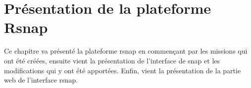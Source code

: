 \chapter{Présentation de la plateforme Rsnap}
Ce chapitre va présenté la plateforme \gls{rsnap} en commençant par les missions qui ont été créées, ensuite vient la présentation de l'interface de \gls{snap} et les modifications qui y ont été apportées. Enfin, vient la présentation de la partie web de l'interface \gls{rsnap}.



